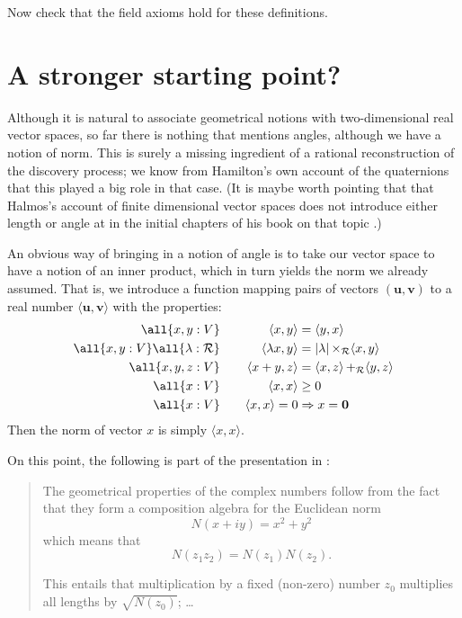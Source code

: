 \documentclass{my-blue-book}
\newcommand{\real}{\mathcal{R}}
\renewcommand{\real}{\mathcal{R}}
\DeclareMathOperator{\plusR}{+_{\real}}
\DeclareMathOperator{\timesR}{\times_{\real}}
\newcommand{\origin}{\mathbf{0}}
\newcommand{\modulus}[1]{\lvert#1\rvert}
\newcommand{\vecU}{\mathbf{u}}
\newcommand{\vecV}{\mathbf{v}}
\newcommand{\iprod}[2]{\langle {#1}, {#2} \rangle}
\begin{document}
Now check that the field axioms hold for these definitions.

\section{A stronger starting point?}
\label{sec:strong-start-point}

Although it is natural to associate geometrical notions with
two-dimensional real vector spaces, so far there is nothing that
mentions angles, although we have a notion of norm.  This is surely a
missing ingredient of a rational reconstruction of the discovery
process; we know from Hamilton's own account of the quaternions that
this played a big role in that case.  (It is maybe worth pointing that
that Halmos's account of finite dimensional vector spaces does not
introduce either length or angle at in the initial chapters of his
book on that topic \parencite{HalmosFDVS}.)

An obvious way of bringing in a notion of angle is to take our
vector space to have a notion of an inner product, which in turn
yields the norm we already assumed.  That is, we introduce a function
mapping pairs of vectors $(\vecU,\vecV)$ to a real number
$\iprod{\vecU}{\vecV}$ with the properties:
\begin{alignat}{2}
  \all{x,y:V} \quad && \iprod{x}{y} &= \iprod{y}{x} \\
  \all{x,y:V} \all{\lambda:\real} \quad && \iprod{\lambda x}{y}
                   &= \modulus{\lambda} \timesR \iprod{x}{y} \\
  \all{x,y,z:V} \quad && \iprod{x + y}{z}
                   &= \iprod{x}{z} \plusR \iprod{y}{z} \\
  \all{x:V} \quad && \iprod{x}{x} & \geq 0 \\
  \all{x:V} \quad && \iprod{x}{x}  = 0 & \Rightarrow x = \origin
\end{alignat}
Then the norm of vector $x$ is simply  $\iprod{x}{x}$.

On this point, the following is part of the presentation in 
\cite[ch 2]{Conway03}:
\begin{quote}
  The geometrical properties of the complex numbers follow from the
fact that they form a composition algebra for the Euclidean norm
$$N(x + iy) = x^2 + y^2$$
which means that
$$N(z_1 z_2) = N(z_1)N(z_2).$$

This entails that multiplication by a fixed (non-zero) number $z_0$
multiplies all lengths by $\sqrt{N(z_0)}$; \; \dots \\
\end{quote}
\end{document}
